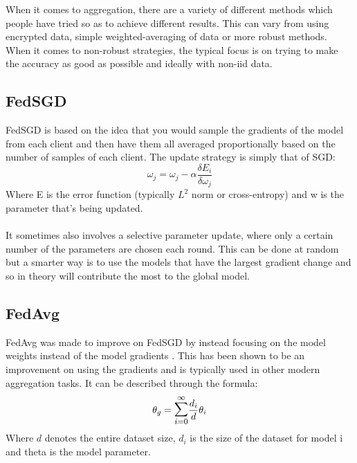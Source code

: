 When it comes to aggregation, there are a variety of different methods which people have tried so as to achieve different results.
This can vary from using encrypted data, simple weighted-averaging of data or more robust methods.
When it comes to non-robust strategies, the typical focus is on trying to make the accuracy as good as possible and ideally with non-iid data.


\subsection{FedSGD}
FedSGD is based on the idea that you would sample the gradients of the model from each client and then have them all averaged proportionally based on the number of samples of each client.
The update strategy is simply that of SGD:
\begin{equation}
    \omega_j = \omega_j - \alpha \dfrac{\delta E_i}{\delta \omega_j}
\end{equation}
Where E is the error function (typically $L^2$ norm or cross-entropy) and w is the parameter that's being updated.
\\ \\
It sometimes also involves a selective parameter update, where only a certain number of the parameters are chosen each round.
This can be done at random but a smarter way is to use the models that have the largest gradient change and so in theory will contribute the most to the global model.


\subsection{FedAvg}
FedAvg was made to improve on FedSGD by instead focusing on the model weights instead of the model gradients \cite[section 2.1]{robagg_health}.
This has been shown to be an improvement on using the gradients and is typically used in other modern aggregation tasks.
It can be described through the formula:
\begin{equation}
    \theta_g = \mathlarger{\mathlarger{\sum}}_{i=0}^{\infty} \dfrac{d_i}{d} \theta_i
\end{equation}
Where $d$ denotes the entire dataset size, $d_i$ is the size of the dataset for model i and theta is the model parameter.


